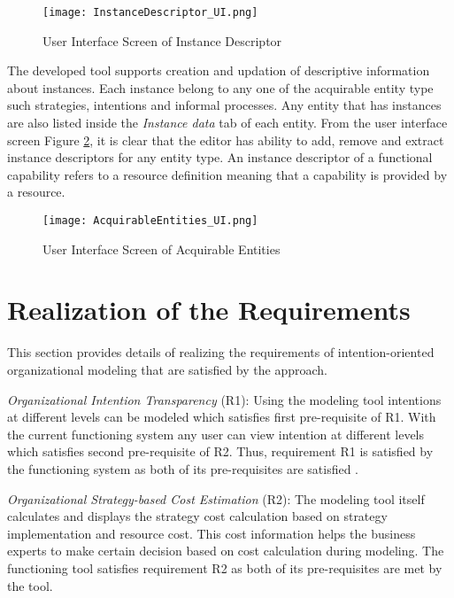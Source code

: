 \begin{figure}
	\centering
	\texttt{[image: InstanceDescriptor\_UI.png]}
	\caption{User Interface Screen of Instance Descriptor}
	\label{fig:realizationofinstances2}
\end{figure}

The developed tool supports creation and updation of descriptive information about instances. Each instance belong to any one of the acquirable entity type such strategies, intentions and informal processes. Any entity that has instances are also listed inside the \textit{Instance data} tab of each entity. From the user interface screen Figure \ref{fig:realizationofinstances}, it is clear that the editor has ability to add, remove and extract instance descriptors for any entity type. An instance descriptor of a functional capability refers to a resource definition meaning that a capability is provided by a resource.
 
\begin{figure}
	\centering
	\texttt{[image: AcquirableEntities\_UI.png]}
	\caption{User Interface Screen of Acquirable Entities}
	\label{fig:realizationofinstances}
\end{figure}

		
\section{Realization of the Requirements}
\label{sec:validation}
This section provides details of realizing the requirements of intention-oriented organizational modeling that are satisfied by the approach. 

\textit{Organizational Intention Transparency} (R1):  Using the modeling tool intentions at different levels can be modeled which satisfies first pre-requisite of R1. With the current functioning system any user can view intention at different levels which satisfies second pre-requisite of R2. Thus, requirement R1 is satisfied by the functioning system as both of its pre-requisites are satisfied .

\textit{Organizational Strategy-based Cost Estimation} (R2): The modeling tool itself calculates and displays the strategy cost calculation based on strategy implementation and resource cost. This cost information helps the business experts to make certain decision based on cost calculation during modeling. The functioning tool satisfies requirement R2 as both of its pre-requisites are met by the tool. 


